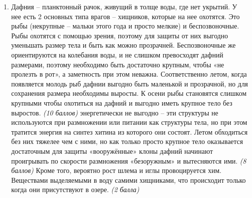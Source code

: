 \solutionSection

\begin{enumerate}
    \item Дафния – планктонный рачок, живущий в толще воды, где нет укрытий. У нее есть 2 основных типа врагов – хищников, которые на нее охотятся. Это рыбы (некрупные – мальки этого года и просто мелкие) и беспозвоночные. Рыбы охотятся с помощью зрения, поэтому для защиты от них выгодно уменьшать размер тела и быть как можно прозрачней. Беспозвоночные же ориентируются на колебания воды, и не слишком превосходят дафний размерами, поэтому необходимо быть достаточно крупным, чтобы «не пролезть в рот», а заметность при этом неважна. Соответственно летом, когда появляется молодь рыб дафнии выгодно быть маленькой и прозрачной, но для сохранения размера необходимы выросты. К осени рыбы становятся слишком крупными чтобы охотиться на дафний и выгодно иметь крупное тело без выростов. \textit{(10 баллов)}
     энергетически не выгодно – эти структуры не используются при размножении или питании как структуры тела, но при этом тратится энергия на синтез хитина из которого они состоят. Летом обходиться без них тяжелее чем с ними, но как только просто крупное тело оказывается достаточным для защиты «вооружённые» клоны дафний начинают проигрывать по скорости размножения «безоружным» и вытесняются ими. \textit{(8 баллов)} Кроме того, вероятно рост шлема и иглы провоцируется хим. Веществами выделяемыми в воду самими хищниками, что происходит только когда они присутствуют в озере. \textit{(2 балла)}
    \end{enumerate}